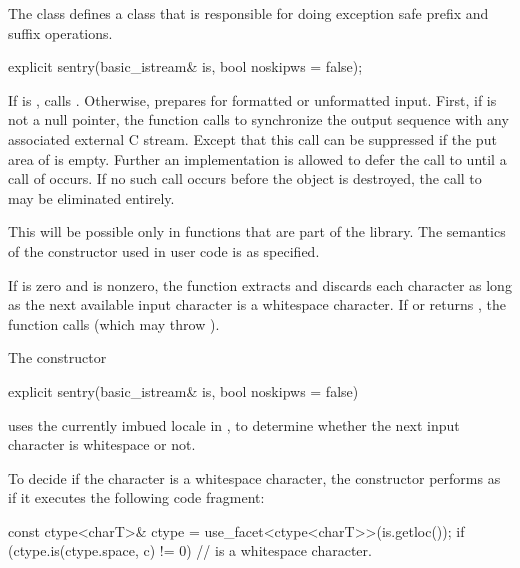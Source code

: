 \begin{itemdescr}
\pnum
The class
defines a class that is responsible for doing exception safe prefix and suffix
operations.
\end{itemdescr}

%
%
\begin{itemdecl}
explicit sentry(basic_istream& is, bool noskipws = false);
\end{itemdecl}

\begin{itemdescr}
\pnum
\effects
If
is
,
calls . Otherwise,
prepares for formatted or
unformatted input.
First, if
is not a null pointer, the
function calls
%
to synchronize the output sequence with any associated external
C stream.
Except that this call can be suppressed if the put area of
is empty.
Further an implementation is allowed to defer the call to
until a
call of
occurs.
If no such call occurs before the
object is destroyed, the call to
may be eliminated entirely.
\begin{footnote}
This will be possible only in functions
that are part of the library.
The semantics of the constructor used in user code is as specified.
\end{footnote}
If  is zero and
is nonzero, the function extracts and discards each character as long as
the next available input character  is a whitespace character.
If
or
returns
,
the function calls
(which may throw
).

\pnum
\remarks
The constructor
\begin{codeblock}
explicit sentry(basic_istream& is, bool noskipws = false)
\end{codeblock}
uses the currently imbued locale in ,
to determine whether the next input character is
whitespace or not.

\pnum
To decide if the character  is a whitespace character,
the constructor performs as if it executes the following code fragment:
\begin{codeblock}
const ctype<charT>& ctype = use_facet<ctype<charT>>(is.getloc());
if (ctype.is(ctype.space, c) != 0)
  //  is a whitespace character.
\end{codeblock}


\end{itemdescr}
